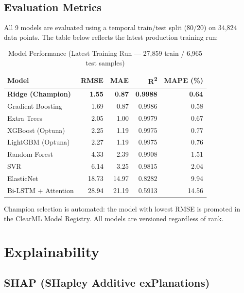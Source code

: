 \documentclass[12pt, a4paper, oneside]{article}
\begin{document}
\subsection{Evaluation Metrics}

All 9 models are evaluated using a temporal train/test split (80/20) on 34,824 data points. The table below reflects the latest production training run:

\begin{table}[H]
\centering
\caption{Model Performance (Latest Training Run --- 27,859 train / 6,965 test samples)}
\label{tab:performance}
\begin{tabular}{lrrrr}
\toprule
\textbf{Model} & \textbf{RMSE} & \textbf{MAE} & \textbf{R\textsuperscript{2}} & \textbf{MAPE (\%)} \\
\midrule
\textbf{Ridge (Champion)} & \textbf{1.55} & \textbf{0.87} & \textbf{0.9988} & \textbf{0.64} \\
Gradient Boosting & 1.69 & 0.87 & 0.9986 & 0.58 \\
Extra Trees & 2.05 & 1.00 & 0.9979 & 0.67 \\
XGBoost (Optuna) & 2.25 & 1.19 & 0.9975 & 0.77 \\
LightGBM (Optuna) & 2.27 & 1.19 & 0.9975 & 0.76 \\
Random Forest & 4.33 & 2.39 & 0.9908 & 1.51 \\
SVR & 6.14 & 3.25 & 0.9815 & 2.04 \\
ElasticNet & 18.73 & 14.97 & 0.8282 & 9.94 \\
Bi-LSTM + Attention & 28.94 & 21.19 & 0.5913 & 14.56 \\
\bottomrule
\end{tabular}
\end{table}

Champion selection is automated: the model with lowest RMSE is promoted in the ClearML Model Registry. All models are versioned regardless of rank.

\section{Explainability}

\subsection{SHAP (SHapley Additive exPlanations)}
\end{document}
